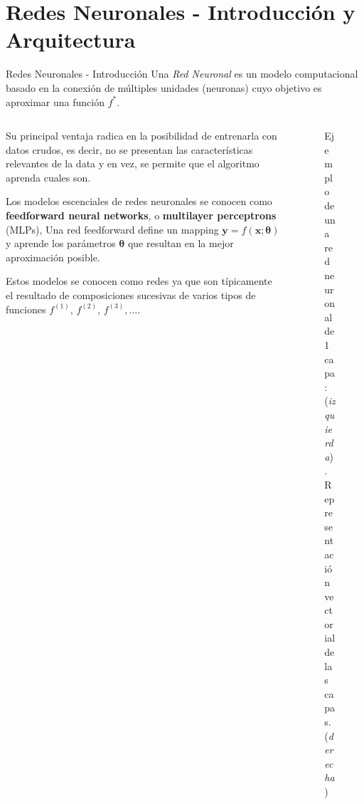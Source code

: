 \documentclass[9pt]{beamer}
\begin{document}
\section{Redes Neuronales - Introducción y Arquitectura}
\begin{frame}{Redes Neuronales - Introducción}
Una \textit{Red Neuronal} es un modelo computacional basado en la conexión de múltiples unidades (neuronas) cuyo objetivo es aproximar una función $f^{*}$.
\pause

\begin{columns}

  \begin{column}{0.5\textwidth}

  Su principal ventaja radica en la posibilidad de entrenarla con datos crudos, es decir, no se presentan las características relevantes de la data y en vez, se permite que el algoritmo aprenda cuales son. \pause

  \vspace{0.1cm}
  Los modelos escenciales de redes neuronales se conocen como \textbf{feedforward neural networks}, o \textbf{multilayer perceptrons} (MLPs), Una red feedforward define un mapping $\bm{y}=f(\bm{x}; \bm{\theta})$ y aprende los parámetros $\bm{\theta}$ que resultan en la mejor aproximación posible. \pause

  \vspace{0.1cm}

  Estos modelos se conocen como redes ya que son típicamente el resultado de composiciones sucesivas de varios tipos de funciones $f^{(1)}$, $f^{(2)}$, $f^{(3)}, \dots$. \pause

  \end{column}
  \begin{column}{0.5\textwidth}
  \begin{figure}[H]
  \centering
  \caption{Ejemplo de una red neuronal de 1 capa: (\textit{izquierda}). \\  Representación vectorial de las capas. (\textit{derecha})}
  \end{figure}


\end{column}
\end{columns}
\end{frame}
\end{document}
